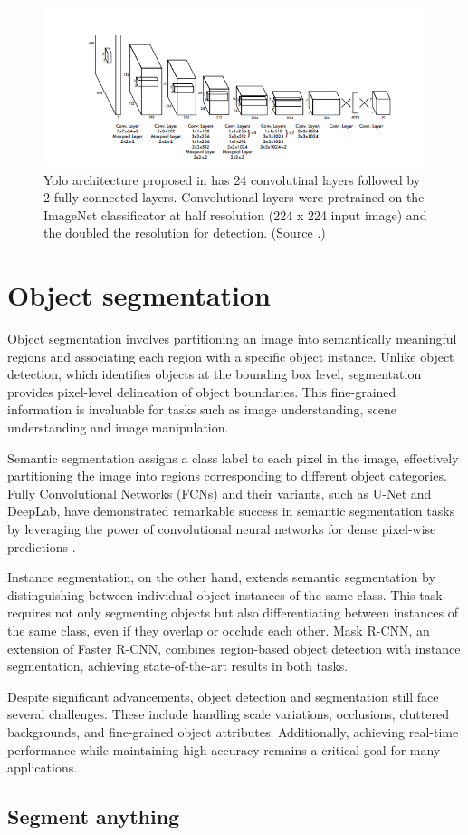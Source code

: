 \begin{figure}
  \centering
  \includegraphics[width=\linewidth]{text/chapter_03/imgs/YOLO_architecture}
  \caption{Yolo architecture proposed in \cite{YOLORedmon2016} has 24 convolutinal layers followed by 2 fully connected layers. Convolutional layers were pretrained on the ImageNet classificator at half resolution (224 x 224 input image) and the doubled the resolution for detection. (Source \cite{YOLORedmon2016}.)}
  \label{fig:yoloArchitecture}
\end{figure}


\section{Object segmentation}
Object segmentation involves partitioning an image into semantically meaningful regions and associating each region
with a specific object instance. Unlike object detection, which identifies objects at the bounding box level, segmentation provides pixel-level delineation of object boundaries. This fine-grained information is invaluable for tasks such as image understanding, scene understanding and image manipulation.

Semantic segmentation assigns a class label to each pixel in the image, effectively partitioning the image into regions corresponding to different object categories. Fully Convolutional Networks (FCNs) and their variants, such as U-Net and DeepLab, have demonstrated remarkable success in semantic segmentation tasks by leveraging the power of convolutional neural networks for dense pixel-wise predictions \cite{SemanticSegmentationGuo2022}.

Instance segmentation, on the other hand, extends semantic segmentation by distinguishing between individual object instances of the same class. This task requires not only segmenting objects but also differentiating between instances of the same class, even if they overlap or occlude each other. Mask R-CNN, an extension of Faster R-CNN, combines region-based object detection with instance segmentation, achieving state-of-the-art results in both tasks.

Despite significant advancements, object detection and segmentation still face several challenges. These include handling scale variations, occlusions, cluttered backgrounds, and fine-grained object attributes. Additionally, achieving real-time performance while maintaining high accuracy remains a critical goal for many applications.

  \subsection{Segment anything}